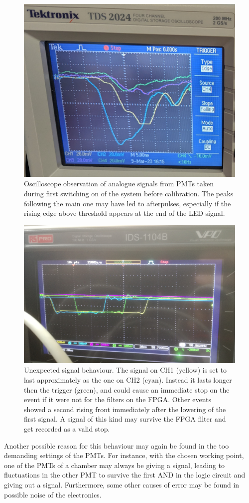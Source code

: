 \documentclass[../main.tex]{subfiles}
\begin{document}
\begin{figure}[h!]
    \centering
    \includegraphics[width=0.55\linewidth]{images/afterpulseanalog.jpg}
    \caption{Oscilloscope observation of analogue signals from PMTs taken during first switching on of the system before calibration. The peaks following the main one may have led to afterpulses, especially if the rising edge above threshold appears at the end of the LED signal.}
    \label{fig:analogafterpulse}
\end{figure}

\begin{figure}[htb!]
    \centering
    \includegraphics[width=0.65\linewidth]{images/afterpulse.jpg}
    \caption{Unexpected signal behaviour. The signal on CH1 (yellow) is set to last approximately as the one on CH2 (cyan). Instead it lasts longer then the trigger (green), and could cause an immediate stop on the event if it were not for the filters on the FPGA. Other events showed a second rising front immediately after the lowering of the first signal. A signal of this kind may survive the FPGA filter and get recorded as a valid stop.}
    \label{fig:afterpulse}
\end{figure}

Another possible reason for this behaviour may again be found in the too demanding settings of the PMTs. For instance, with the chosen working point, one of the PMTs of a chamber may always be giving a signal, leading to fluctuations in the other PMT to survive the first AND in the logic circuit and giving out a signal. Furthermore, some other causes of error may be found in possible noise of the electronics.
\end{document}
